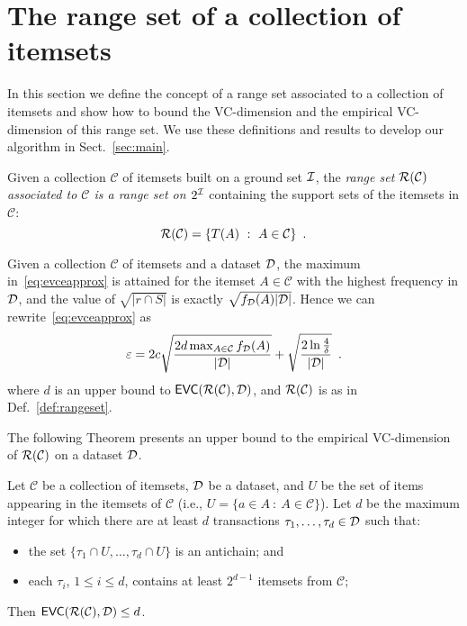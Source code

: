 \section{The range set of a collection of itemsets}\label{sec:range}
In this section we define the concept of a range set associated to a
collection of itemsets and show how to bound the VC-dimension and the
empirical VC-dimension of this range set. We use these definitions and results
to develop our algorithm in Sect.~\ref{sec:main}.

\begin{definition}\label{def:rangeset}
Given a collection $\mathcal{C}$ of itemsets built on a ground set ${\cal I}$, the
\emph{range set $\mathcal{R}(\mathcal{C})$ associated to $\mathcal{C}$ is a range
set on $2^{\cal I}$} containing the support sets of the itemsets in $\mathcal{C}$:
\[
	\mathcal{R}(\mathcal{C})=\{T(A) ~:~ A\in\mathcal{C}\}\enspace.
\]
\end{definition}

\begin{fact}\label{fact:maxfreq}
	Given a collection $\mathcal{C}$ of itemsets and a dataset ${\cal D}$, the maximum
	in~\eqref{eq:evceapprox} is attained for the itemset $A\in\mathcal{C}$ with the
	highest frequency in ${\cal D}$, and the value of $\sqrt{|r\cap S|}$ is exactly
	$\sqrt{f_{\cal D}(A)|{\cal D}|}$. Hence we can rewrite~\eqref{eq:evceapprox} as
	\begin{equation}\label{eq:evceapproxitemsets}
		\varepsilon = 2c\sqrt{\frac{2d\max_{A\in\mathcal{C}}f_{\cal D}(A)}{|{\cal D}|}} +
		\sqrt{\frac{2\ln\frac{4}{\delta}}{|{\cal D}|}}\enspace.
	\end{equation}
	where $d$ is an
	upper bound to $\mathsf{EVC}(\mathcal{R}(\mathcal{C}),{\cal D})$, and $\mathcal{R}(\mathcal{C})$ is
	as in Def.~\ref{def:rangeset}.
\end{fact}

The following Theorem presents an upper bound to the empirical VC-dimension of
$\mathcal{R}(\mathcal{C})$ on a dataset ${\cal D}$.

\begin{theorem}\label{lem:evcdimupbound}
  Let $\mathcal{C}$ be a collection of itemsets, ${\cal D}$ be a dataset, and $U$ be
  the set of items appearing in the itemsets of $\mathcal{C}$ (i.e., $U=\{a\in A ~:~
  A\in\mathcal{C}\}$). Let $d$ be the maximum integer for which there are at
  least $d$ transactions $\tau_1,\dotsc,\tau_d\in {\cal D}$ such that:
  \begin{itemize}
	\item the set $\{\tau_1\cap U,\dotsc,\tau_d\cap U\}$ is an antichain; and
	\item each $\tau_i$, $1\le i\le d$, contains at least $2^{d-1}$ itemsets
		from $\mathcal{C}$;
  \end{itemize}
  Then $\mathsf{EVC}(\mathcal{R}(\mathcal{C}),{\cal D})\le d$.
\end{theorem}

